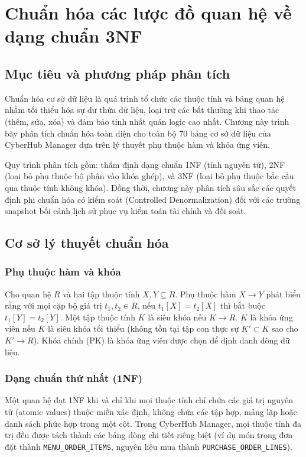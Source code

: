 \chapter{Chuẩn hóa các lược đồ quan hệ về dạng chuẩn 3NF}

\section{Mục tiêu và phương pháp phân tích}
Chuẩn hóa cơ sở dữ liệu là quá trình tổ chức các thuộc tính và bảng quan hệ nhằm tối thiểu hóa sự dư thừa dữ liệu, loại trừ các bất thường khi thao tác (thêm, sửa, xóa) và đảm bảo tính nhất quán logic cao nhất. Chương này trình bày phân tích chuẩn hóa toàn diện cho toàn bộ 70 bảng cơ sở dữ liệu của CyberHub Manager dựa trên lý thuyết phụ thuộc hàm và khóa ứng viên.\par

Quy trình phân tích gồm: thẩm định dạng chuẩn 1NF (tính nguyên tử), 2NF (loại bỏ phụ thuộc bộ phận vào khóa ghép), và 3NF (loại bỏ phụ thuộc bắc cầu qua thuộc tính không khóa). Đồng thời, chương này phân tích sâu sắc các quyết định phi chuẩn hóa có kiểm soát (Controlled Denormalization) đối với các trường snapshot bối cảnh lịch sử phục vụ kiểm toán tài chính và đối soát.\par

\section{Cơ sở lý thuyết chuẩn hóa}
\subsection{Phụ thuộc hàm và khóa}
Cho quan hệ $R$ và hai tập thuộc tính $X, Y \subseteq R$. Phụ thuộc hàm $X \rightarrow Y$ phát biểu rằng với mọi cặp bộ giá trị $t_1, t_2 \in R$, nếu $t_1[X] = t_2[X]$ thì bắt buộc $t_1[Y] = t_2[Y]$. Một tập thuộc tính $K$ là siêu khóa nếu $K \rightarrow R$. $K$ là khóa ứng viên nếu $K$ là siêu khóa tối thiểu (không tồn tại tập con thực sự $K' \subset K$ sao cho $K' \rightarrow R$). Khóa chính (PK) là khóa ứng viên được chọn để định danh dòng dữ liệu.\par

\subsection{Dạng chuẩn thứ nhất (1NF)}
Một quan hệ đạt 1NF khi và chỉ khi mọi thuộc tính chỉ chứa các giá trị nguyên tử (atomic values) thuộc miền xác định, không chứa các tập hợp, mảng lặp hoặc danh sách phức hợp trong một cột. Trong CyberHub Manager, mọi thuộc tính đa trị đều được tách thành các bảng dòng chi tiết riêng biệt (ví dụ món trong đơn đặt thành \texttt{MENU\_ORDER\_ITEMS}, nguyên liệu mua thành \texttt{PURCHASE\_ORDER\_LINES}).\par

